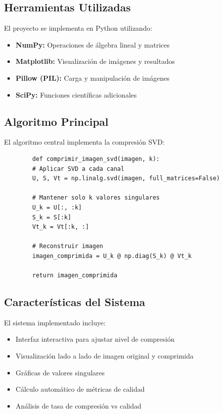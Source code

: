 \documentclass[12pt,a4paper]{article}
\begin{document}
	\subsection{Herramientas Utilizadas}
	
	El proyecto se implementa en Python utilizando:
	\begin{itemize}
		\item \textbf{NumPy:} Operaciones de álgebra lineal y matrices
		\item \textbf{Matplotlib:} Visualización de imágenes y resultados
		\item \textbf{Pillow (PIL):} Carga y manipulación de imágenes
		\item \textbf{SciPy:} Funciones científicas adicionales
	\end{itemize}
	
	\subsection{Algoritmo Principal}
	
	El algoritmo central implementa la compresión SVD:
	
	\begin{verbatim}
		def comprimir_imagen_svd(imagen, k):
		# Aplicar SVD a cada canal
		U, S, Vt = np.linalg.svd(imagen, full_matrices=False)
		
		# Mantener solo k valores singulares
		U_k = U[:, :k]
		S_k = S[:k]
		Vt_k = Vt[:k, :]
		
		# Reconstruir imagen
		imagen_comprimida = U_k @ np.diag(S_k) @ Vt_k
		
		return imagen_comprimida
	\end{verbatim}
	
	\subsection{Características del Sistema}
	
	El sistema implementado incluye:
	\begin{itemize}
		\item Interfaz interactiva para ajustar nivel de compresión
		\item Visualización lado a lado de imagen original y comprimida
		\item Gráficas de valores singulares
		\item Cálculo automático de métricas de calidad
		\item Análisis de tasa de compresión vs calidad
	\end{itemize}
	
\end{document}

